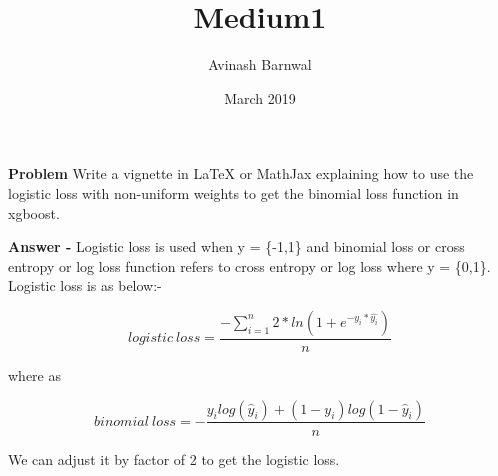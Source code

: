 \documentclass{article}
\title{Medium1}
\author{Avinash Barnwal}
\date{March 2019}
\begin{document}
\maketitle

\begin{flushleft}

\textbf{Problem} Write a vignette in LaTeX or MathJax explaining how to use the logistic loss with non-uniform weights to get the binomial loss function in xgboost.

\textbf{Answer -} Logistic loss is used when y = \{-1,1\} and binomial loss or cross entropy or log loss function refers to cross entropy or log loss where y = \{0,1\}. Logistic loss is as below:-

\begin{equation}
logistic\ loss = \frac{-\sum_{i=1}^n2*ln(1+e^{-y_i*\hat{y_i}})}{n}   
\end{equation}

where as

\begin{equation}
binomial\ loss = -\frac{y_ilog(\hat{y}_i)+(1-y_i)log(1-\hat{y}_i)}{n}    
\end{equation}

We can adjust it by factor of 2 to get the logistic loss.
\end{flushleft}
\end{document}
